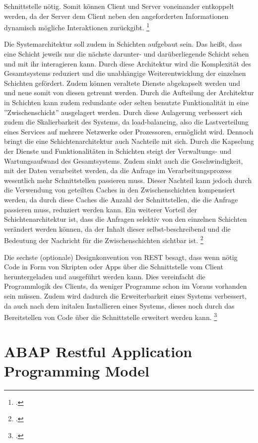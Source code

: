 Schnittstelle nötig. Somit können Client und Server voneinander entkoppelt werden, da der Server dem Client neben den angeforderten Informationen dynamisch mögliche Interaktionen zurückgibt. \footcite[Vgl.][]{fielding_rest_2008}

Die Systemarchitektur soll zudem in Schichten aufgebaut sein. Das hei{\ss}t, dass eine Schicht jeweils nur die nächste darunter- und darüberliegende Schicht sehen und mit ihr interagieren kann. Durch diese Architektur wird die Komplexität des Gesamtsystems reduziert und die unabhängige Weiterentwicklung der einzelnen Schichten gefördert. Zudem können veraltete Dienste abgekapselt werden und und neue somit von diesen getrennt werden. Durch die Aufteilung der Architektur in Schichten kann zudem redundante oder selten benutzte Funktionalität in eine ''Zwischenschicht'' ausgelagert werden. Durch diese Aulagerung verbessert sich zudem die Skalierbarkeit des Systems, da load-balancing, also die Lastverteilung eines Services auf mehrere Netzwerke oder Prozessoren, ermöglicht wird. Dennoch bringt die eine Schichtenarchitektur auch Nachteile mit sich. Durch die Kapselung der Dienste und Funktionalitäten in Schichten steigt der Verwaltungs- und Wartungsaufwand des Gesamtsystems. Zudem sinkt auch die Geschwindigkeit, mit der Daten verarbeitet werden, da die Anfrage im Verarbeitungsprozess wesentlich mehr Schnittstellen passieren muss. Dieser Nachteil kann jedoch durch die Verwendung von geteilten Caches in den Zwischenschichten kompensiert werden, da durch diese Caches die Anzahl der Schnittstellen, die die Anfrage passieren muss, reduziert werden kann. Ein weiterer Vorteil der Schichtenarchitektur ist, dass die Anfragen selektiv von den einzelnen Schichten verändert werden können, da der Inhalt dieser selbst-beschreibend und die Bedeutung der Nachricht für die Zwischenschichten sichtbar ist. \footcite[Vgl.][]{fielding_architectural_2000}

Die sechste (optionale) Designkonvention von REST besagt, dass wenn nötig Code in Form von Skripten oder Apps über die Schnittstelle vom Client heruntergeladen und ausgeführt werden kann. Dies vereinfacht die Programmlogik des Clients, da weniger Programme schon im Voraus vorhanden sein müssen. Zudem wird dadurch die Erweiterbarkeit eines Systems verbessert, da auch nach dem initalen Installieren eines Systems, dieses noch durch das Bereitstellen von Code über die Schnittstelle erweitert werden kann. \footcite[Vgl.][]{fielding_architectural_2000}

\section{ABAP Restful Application Programming Model}

